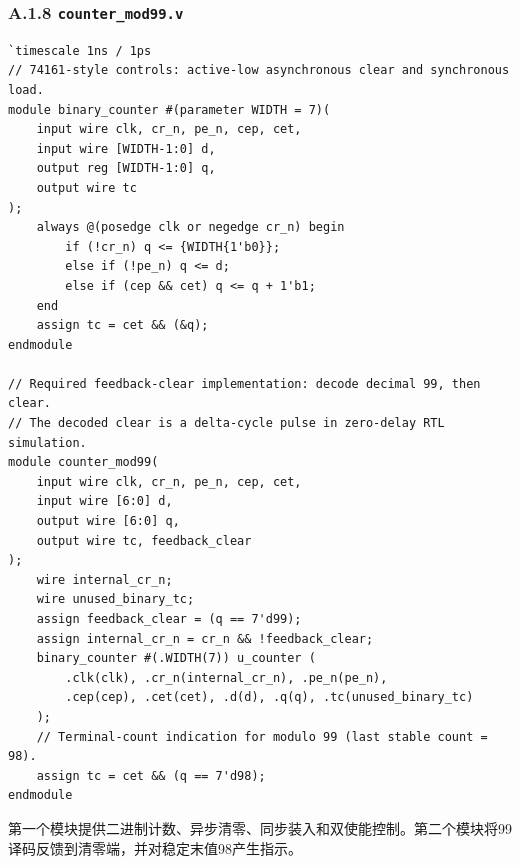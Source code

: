 \documentclass[12pt,a4paper]{ctexart}
\begin{document}
\subsubsection*{A.1.8 \texttt{counter\_mod99.v}}
\begin{lstlisting}
`timescale 1ns / 1ps
// 74161-style controls: active-low asynchronous clear and synchronous load.
module binary_counter #(parameter WIDTH = 7)(
    input wire clk, cr_n, pe_n, cep, cet,
    input wire [WIDTH-1:0] d,
    output reg [WIDTH-1:0] q,
    output wire tc
);
    always @(posedge clk or negedge cr_n) begin
        if (!cr_n) q <= {WIDTH{1'b0}};
        else if (!pe_n) q <= d;
        else if (cep && cet) q <= q + 1'b1;
    end
    assign tc = cet && (&q);
endmodule

// Required feedback-clear implementation: decode decimal 99, then clear.
// The decoded clear is a delta-cycle pulse in zero-delay RTL simulation.
module counter_mod99(
    input wire clk, cr_n, pe_n, cep, cet,
    input wire [6:0] d,
    output wire [6:0] q,
    output wire tc, feedback_clear
);
    wire internal_cr_n;
    wire unused_binary_tc;
    assign feedback_clear = (q == 7'd99);
    assign internal_cr_n = cr_n && !feedback_clear;
    binary_counter #(.WIDTH(7)) u_counter (
        .clk(clk), .cr_n(internal_cr_n), .pe_n(pe_n),
        .cep(cep), .cet(cet), .d(d), .q(q), .tc(unused_binary_tc)
    );
    // Terminal-count indication for modulo 99 (last stable count = 98).
    assign tc = cet && (q == 7'd98);
endmodule
\end{lstlisting}
第一个模块提供二进制计数、异步清零、同步装入和双使能控制。第二个模块将99译码反馈到清零端，并对稳定末值98产生指示。
\end{document}
